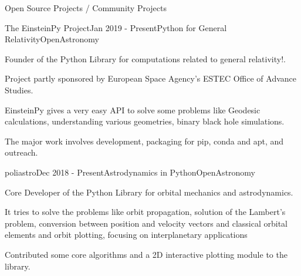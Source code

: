 \documentclass{resume} %
\begin{document}
\begin{rSection}{Open Source Projects / Community Projects}

\begin{rSubsection}{The EinsteinPy Project}{Jan 2019 - Present}{Python for General Relativity}{OpenAstronomy}
\item Founder of the Python Library for computations related to general relativity!.
\item  Project partly sponsored by European Space Agency's ESTEC Office of Advance Studies.   
\item EinsteinPy gives a very easy API to solve some problems like Geodesic calculations, understanding various geometries, binary black hole simulations. 
\item The major work involves development, packaging for pip, conda and apt, and outreach.
 \end{rSubsection}

\begin{rSubsection}{poliastro}{Dec 2018 - Present}{Astrodynamics in Python}{OpenAstronomy}
\item Core Developer of the Python Library for orbital mechanics and astrodynamics.
\item  It tries to solve the problems like orbit propagation, solution of the Lambert's problem, conversion between position and velocity vectors and classical orbital elements and orbit plotting, focusing on interplanetary applications
\item Contributed some core algorithms and a 2D interactive plotting module to the library.
 \end{rSubsection}
 
 
\end{rSection}
\end{document}
